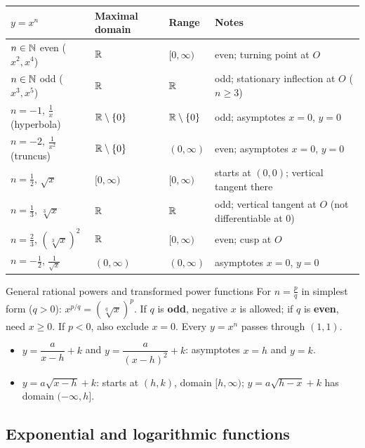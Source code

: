 \begin{center}
\small
\begin{tabularx}{\linewidth}{@{}lllL@{}}
\toprule
$y=x^n$ & Maximal domain & Range & Notes \\
\midrule
$n\in\mathbb{N}$ even ($x^2,x^4$) & $\mathbb{R}$ & $[0,\infty)$ & even; turning point at $O$ \\
$n\in\mathbb{N}$ odd ($x^3,x^5$) & $\mathbb{R}$ & $\mathbb{R}$ & odd; stationary inflection at $O$ ($n\ge3$) \\
$n=-1$, $\frac1x$ (hyperbola) & $\mathbb{R}\setminus\{0\}$ & $\mathbb{R}\setminus\{0\}$ & odd; asymptotes $x=0$, $y=0$ \\
$n=-2$, $\frac{1}{x^2}$ (truncus) & $\mathbb{R}\setminus\{0\}$ & $(0,\infty)$ & even; asymptotes $x=0$, $y=0$ \\
$n=\frac12$, $\sqrt{x}$ & $[0,\infty)$ & $[0,\infty)$ & starts at $(0,0)$; vertical tangent there \\
$n=\frac13$, $\sqrt[3]{x}$ & $\mathbb{R}$ & $\mathbb{R}$ & odd; vertical tangent at $O$ (not differentiable at $0$) \\
$n=\frac23$, $\left(\sqrt[3]{x}\right)^2$ & $\mathbb{R}$ & $[0,\infty)$ & even; cusp at $O$ \\
$n=-\frac12$, $\frac{1}{\sqrt{x}}$ & $(0,\infty)$ & $(0,\infty)$ & asymptotes $x=0$, $y=0$ \\
\bottomrule
\end{tabularx}
\end{center}

\begin{keyres}{General rational powers and transformed power functions}
For $n=\frac{p}{q}$ in simplest form ($q>0$): $x^{p/q}=\left(\sqrt[q]{x}\right)^p$. If $q$ is \textbf{odd}, negative $x$ is allowed; if $q$ is \textbf{even}, need $x\ge0$. If $p<0$, also exclude $x=0$. Every $y=x^n$ passes through $(1,1)$.
\begin{itemize}
  \item $y=\dfrac{a}{x-h}+k$ and $y=\dfrac{a}{(x-h)^2}+k$: asymptotes $x=h$ and $y=k$.
  \item $y=a\sqrt{x-h}+k$: starts at $(h,k)$, domain $[h,\infty)$; $y=a\sqrt{h-x}+k$ has domain $(-\infty,h]$.
\end{itemize}
\end{keyres}

\subsection{Exponential and logarithmic functions}
\label{sec:explog}

